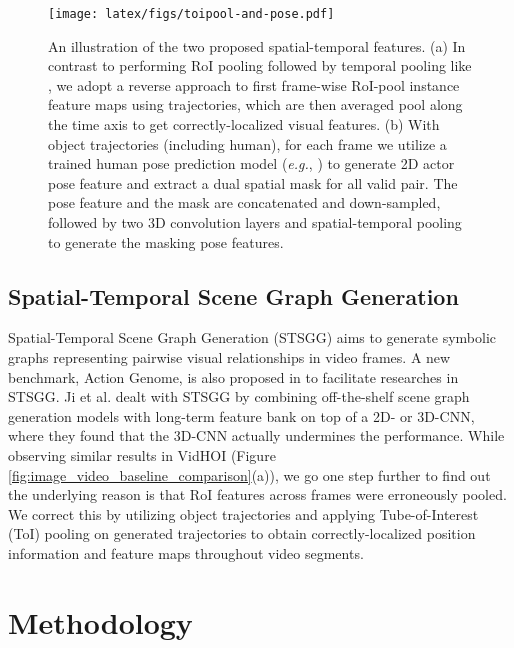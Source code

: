 \documentclass[sigconf]{acmart}
\begin{document}
\begin{figure*}[t!]
\centering
\texttt{[image: latex/figs/toipool-and-pose.pdf]}
\vspace{-1em}
\caption{An illustration of the two proposed spatial-temporal features.
(a) In contrast to performing RoI pooling followed by temporal pooling like \cite{wu2019long,feichtenhofer2019slowfast}, we adopt a reverse approach to first frame-wise RoI-pool instance feature maps using trajectories, which are then averaged pool along the time axis to get correctly-localized visual features. 
(b) With  object trajectories (including  human), for each frame we utilize a trained human pose prediction model (\emph{e.g.}, \cite{fang2017rmpe}) to generate 2D actor pose feature and extract a dual spatial mask for all  valid pair. 
The pose feature and the mask are concatenated and down-sampled, followed by two 3D convolution layers and spatial-temporal pooling to generate the masking pose features.
}
\label{fig:toipool_and_pose}
\vspace{-0.5em}
\end{figure*}

\subsection{Spatial-Temporal Scene Graph Generation}
\label{subsec:stsgg}

Spatial-Temporal Scene Graph Generation (STSGG) \cite{ji2020action} aims to generate symbolic graphs representing pairwise visual relationships in video frames.
A new benchmark, Action Genome, is also proposed in \cite{ji2020action} to facilitate researches in STSGG.
Ji et al. \cite{ji2020action} dealt with STSGG by combining off-the-shelf scene graph generation models with long-term feature bank \cite{wu2019long} on top of a 2D- or 3D-CNN, where they found that the 3D-CNN actually undermines the performance.
While observing similar results in VidHOI (Figure \ref{fig:image_video_baseline_comparison}(a)), we go one step further to find out the underlying reason is that RoI features across frames were erroneously pooled.
We correct this by utilizing object trajectories and applying Tube-of-Interest (ToI) pooling on generated trajectories to obtain correctly-localized position information and feature maps throughout video segments.



\section{Methodology}
\label{sec:methodology}
\end{document}
